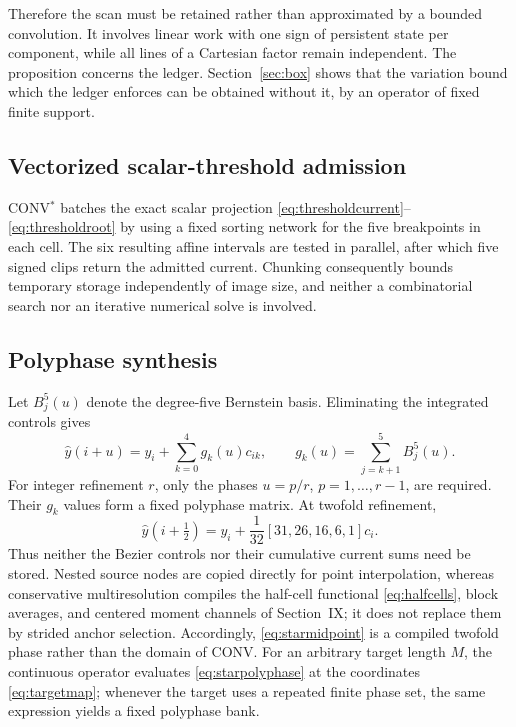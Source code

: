 \documentclass[journal]{IEEEtran}
\begin{document}
Therefore the scan must be retained rather than approximated by a bounded
convolution. It involves linear work with one sign of persistent state per
component, while all lines of a Cartesian factor remain independent.
The proposition concerns the ledger. Section~\ref{sec:box} shows that the
variation bound which the ledger enforces can be obtained without it, by
an operator of fixed finite support.

\subsection{Vectorized scalar-threshold admission}

CONV$^{*}$ batches the exact scalar projection
\eqref{eq:thresholdcurrent}--\eqref{eq:thresholdroot} by using a fixed sorting
network for the five breakpoints in each cell. The six resulting affine
intervals are tested in parallel, after which five signed clips return the
admitted current. Chunking consequently bounds temporary storage
independently of image size, and neither a combinatorial search nor an
iterative numerical solve is involved.

\subsection{Polyphase synthesis}

Let \(B_j^5(u)\) denote the degree-five Bernstein basis. Eliminating the
integrated controls gives
\begin{equation}
 \widehat y(i+u)=y_i+\sum_{k=0}^{4}g_k(u)c_{ik},\qquad
 g_k(u)=\sum_{j=k+1}^{5}B_j^5(u).
 \label{eq:starpolyphase}
\end{equation}
For integer refinement \(r\), only the phases \(u=p/r\),
\(p=1,\ldots,r-1\), are required. Their \(g_k\) values form a fixed
polyphase matrix. At twofold refinement,
\begin{equation}
 \widehat y(i+\tfrac12)=y_i+\frac{1}{32}
 [31,26,16,6,1]c_i.
 \label{eq:starmidpoint}
\end{equation}
Thus neither the Bezier controls nor their cumulative current sums need be
stored. Nested source nodes are copied directly for point interpolation,
whereas conservative multiresolution compiles the half-cell functional
\eqref{eq:halfcells}, block averages, and centered moment channels of
Section~IX; it does not replace them by strided anchor selection.
Accordingly, \eqref{eq:starmidpoint} is a compiled twofold phase rather than
the domain of CONV. For an arbitrary target length \(M\), the continuous
operator evaluates \eqref{eq:starpolyphase} at the coordinates
\eqref{eq:targetmap}; whenever the target uses a repeated finite phase set,
the same expression yields a fixed polyphase bank.
\end{document}
